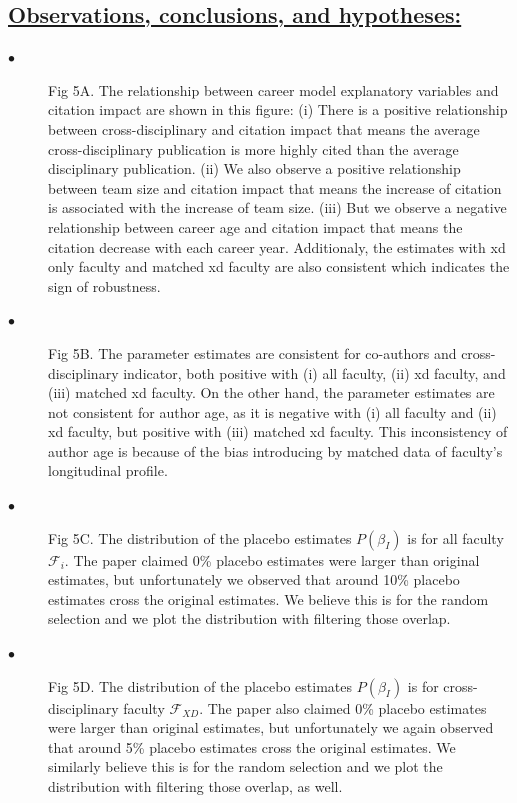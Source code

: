 \documentclass{article}\usepackage[]{graphicx}\usepackage[]{color}
\begin{document}
\subsection*{\underline{Observations, conclusions, and hypotheses:}}
\begin{description}
  \item[$\bullet$] Fig 5A. The relationship between career model explanatory variables and citation impact are shown in this figure: (i) There is a positive relationship between cross-disciplinary and citation impact that means the average cross-disciplinary publication is more highly cited than the average disciplinary publication. (ii) We also observe a positive relationship between team size and citation impact that means the increase of citation is associated with the increase of team size. (iii) But we observe a negative relationship between career age and citation impact that means the citation decrease with each career year. Additionaly, the estimates with xd only faculty and matched xd faculty are also consistent which indicates the sign of robustness.
  \item[$\bullet$] Fig 5B. The parameter estimates are consistent for co-authors and cross-disciplinary indicator, both positive with (i) all faculty, (ii) xd faculty, and (iii) matched xd faculty. On the other hand, the parameter estimates are not consistent for author age, as it is negative with (i) all faculty and (ii) xd faculty, but positive with (iii) matched xd faculty. This inconsistency of author age is because of the bias introducing by matched data of faculty's longitudinal profile.
  \item[$\bullet$] Fig 5C. The distribution of the placebo estimates $P({\beta}_I)$ is for all faculty $\mathcal{F}_i$. The paper claimed 0\% placebo estimates were larger than original estimates, but unfortunately we observed that around 10\% placebo estimates cross the original estimates. We believe this is for the random selection and we plot the distribution with filtering those overlap.
  \item[$\bullet$] Fig 5D. The distribution of the placebo estimates $P({\beta}_I)$ is for cross-disciplinary faculty $\mathcal{F}_{XD}$. The paper also claimed 0\% placebo estimates were larger than original estimates, but unfortunately we again observed that around 5\% placebo estimates cross the original estimates. We similarly believe this is for the random selection and we plot the distribution with filtering those overlap, as well.
\end{description}
\end{document}
